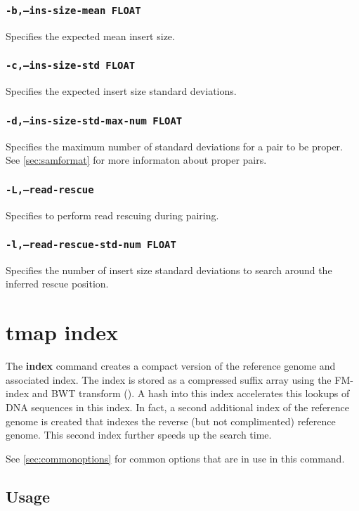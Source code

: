 \documentclass[a4paper,12pt]{book}
\newcommand{\TT}[1]{{\tt #1}} %
\newcommand{\BF}[1]{{\bf #1}} %
\begin{document}
\subsubsection{\TT{-b,--ins-size-mean FLOAT}}
Specifies the expected mean insert size.

\subsubsection{\TT{-c,--ins-size-std FLOAT}}
Specifies the expected insert size standard deviations.

\subsubsection{\TT{-d,--ins-size-std-max-num FLOAT}}
Specifies the maximum number of standard deviations for a pair to be proper.
See \autoref{sec:samformat} for more informaton about proper pairs.

\subsubsection{\TT{-L,--read-rescue}}
Specifies to perform read rescuing during pairing.

\subsubsection{\TT{-l,--read-rescue-std-num FLOAT}}
Specifies the number of insert size standard deviations to search around the inferred rescue position.

\section{tmap index}
\label{sec:index}
The \BF{index} command creates a compact version of the reference genome and associated index.
The index is stored as a compressed suffix array using the FM-index and BWT transform (\cite{FM-index,BWT}).
A hash into this index accelerates this lookups of DNA sequences in this index.
In fact, a second additional index of the reference genome is created that indexes the reverse (but not complimented) reference genome.
This second index further speeds up the search time.

See \autoref{sec:commonoptions} for common options that are in use in this command.

\subsection{Usage}
\end{document}
